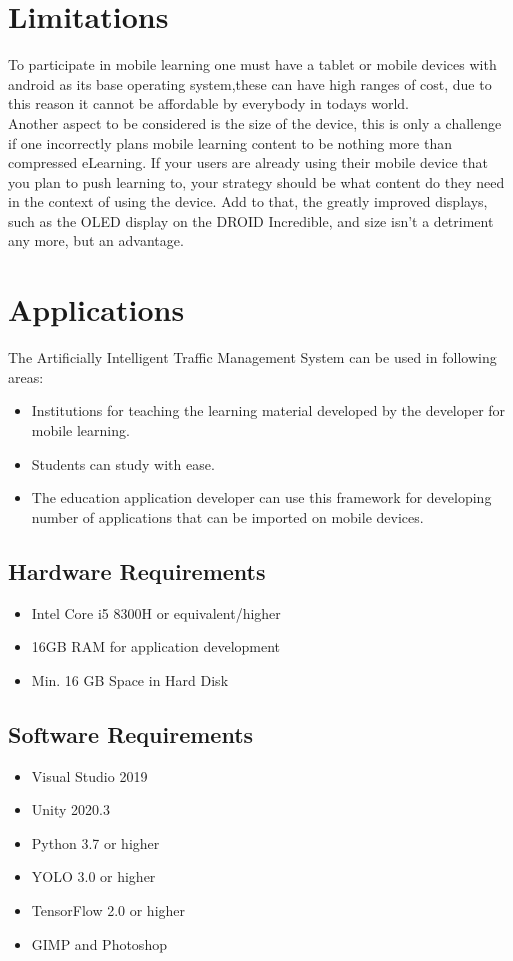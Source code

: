 \documentclass[openany,12pt]{report}
\begin{document}
\section{Limitations}
\hspace*{0.5in}To participate in mobile learning one must have a tablet or mobile devices with android as its base operating system,these can have high ranges of cost, due to this reason it cannot be affordable by everybody in todays world.
\\
\hspace*{0.5in}Another aspect to be considered is the size of the device, this is only a challenge if one incorrectly plans mobile learning content to be nothing more than compressed eLearning. If your users are already using their mobile device that you plan to push learning to, your strategy should be what content do they need in the context of using the device. Add to that, the greatly improved displays, such as the OLED display on the DROID Incredible, and size isn't a detriment any more, but an advantage.

\section{Applications}
\hspace*{0.5in}The Artificially Intelligent Traffic Management System can be used in following areas:
\begin{itemize}
\item{Institutions for teaching the learning material developed by the developer for mobile learning.}
\item{Students can study with ease.}
\item{The education application developer can use this framework for developing number of applications that can be imported on mobile devices.}
\end{itemize}

\subsection{Hardware Requirements}
\begin{itemize}
\item{Intel Core i5 8300H or equivalent/higher}
\newpage
\item{16GB RAM for application development}
\item{Min. 16 GB Space in Hard Disk}
\end{itemize}

\subsection{Software Requirements}
\begin{itemize}
\item{Visual Studio 2019}
\item{Unity 2020.3}
\item{Python 3.7 or higher}
\item{YOLO 3.0 or higher}
\item{TensorFlow 2.0 or higher}
\item{GIMP and Photoshop}
\end{itemize}
\end{document}
